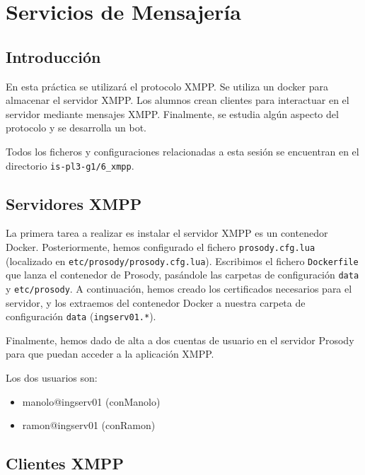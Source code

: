 
\section{Servicios de Mensajería}

\subsection{Introducción}

En esta práctica se utilizará el protocolo XMPP.
Se utiliza un docker para almacenar el servidor XMPP.
Los alumnos crean clientes para interactuar en el servidor mediante mensajes XMPP.
Finalmente, se estudia algún aspecto del protocolo y se desarrolla un bot.

\begin{notebox}
Todos los ficheros y configuraciones relacionadas a esta sesión se encuentran en el directorio
\lstinline{is-pl3-g1/6_xmpp}.
\end{notebox}

\subsection{Servidores XMPP}

La primera tarea a realizar es instalar el servidor XMPP es un contenedor Docker.
Posteriormente, hemos configurado el fichero \lstinline{prosody.cfg.lua} 
(localizado en \lstinline{etc/prosody/prosody.cfg.lua}).
Escribimos el fichero \lstinline{Dockerfile} que lanza el contenedor de Prosody,
pasándole las carpetas de configuración \lstinline{data} y \lstinline{etc/prosody}.
A continuación, hemos creado los certificados necesarios para el servidor, y los extraemos
del contenedor Docker a nuestra carpeta de configuración \lstinline{data} (\lstinline{ingserv01.*}).

Finalmente, hemos dado de alta a dos cuentas de usuario en el servidor Prosody
para que puedan acceder a la aplicación XMPP.

Los dos usuarios son:
\begin{itemize}[itemsep=0.10px]
    \item manolo@ingserv01 (conManolo)
    \item ramon@ingserv01 (conRamon)
\end{itemize}

\subsection{Clientes XMPP}

